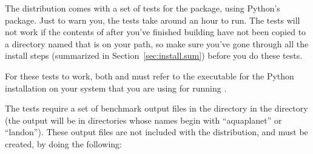 %


%

The  distribution comes with a set of tests for the
package, using Python's  package.  
Just to warn you, the tests take around an hour to run.
The tests will not work if the contents of 
after you've finished building  have not been copied
to a directory named  that is on your  path,
so make sure you've gone through all the install steps
(summarized in Section~\ref{sec:install.sum}) before you do these
tests.

  For these tests to work, both  and
 must refer to the executable for the Python
installation on your system that you are using for running .

The tests require a set of benchmark output files in the
 directory in the
\fn{}directory (the output will be in
directories whose names begin with ``aquaplanet'' or ``landon'').
These output files are not included with the  distribution,
and must be created, by doing the following:

